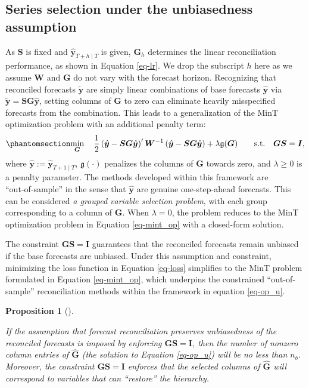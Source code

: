 \documentclass[
  11pt]{article}
\theoremstyle{plain}
\newtheorem{proposition}{Proposition}[section]
\theoremstyle{remark}
\begin{document}
\subsection{Series selection under the unbiasedness
assumption}\label{sec-constrained}

As \(\bm{S}\) is fixed and \(\hat{\bm{y}}_{T+h \mid T}\) is given,
\(\bm{G}_h\) determines the linear reconciliation performance, as shown
in Equation \eqref{eq-lr}. We drop the subscript \(h\) here as we assume
\(\bm{W}\) and \(\bm{G}\) do not vary with the forecast horizon.
Recognizing that reconciled forecasts \(\tilde{\bm{y}}\) are simply
linear combinations of base forecasts \(\hat{\bm{y}}\) via
\(\tilde{\bm{y}}=\bm{SG}\hat{\bm{y}}\), setting columns of \(\bm{G}\) to
zero can eliminate heavily misspecified forecasts from the combination.
This leads to a generalization of the MinT optimization problem with an
additional penalty term: \begin{equation}\phantomsection\label{eq-op_u}{
\min_{\bm{G}} \quad \frac{1}{2}\left(\hat{\bm{y}}-\bm{SG}\hat{\bm{y}}\right)^{\prime} \bm{W}^{-1}\left(\hat{\bm{y}}-\bm{SG}\hat{\bm{y}}\right)
+ \lambda\mathfrak{g}(\bm{G}) \qquad \text{s.t.} \quad \bm{G}\bm{S}=\bm{I},
}\end{equation} where \(\hat{\bm{y}}:=\hat{\bm{y}}_{T+1 \mid T}\),
\(\mathfrak{g}(\cdot)\) penalizes the columns of \(\bm{G}\) towards
zero, and \(\lambda \geq 0\) is a penalty parameter. The methods
developed within this framework are ``out‑of‑sample'' in the sense that
\(\hat{\bm{y}}\) are genuine one-step-ahead forecasts. This can be
considered \emph{a grouped variable selection problem}, with each group
corresponding to a column of \(\bm{G}\). When \(\lambda = 0\), the
problem reduces to the MinT optimization problem in Equation
\eqref{eq-mint_op} with a closed-form solution.

The constraint \(\bm{G}\bm{S}=\bm{I}\) guarantees that the reconciled
forecasts remain unbiased if the base forecasts are unbiased. Under this
assumption and constraint, minimizing the loss function in Equation
\eqref{eq-loss} simplifies to the MinT problem formulated in Equation
\eqref{eq-mint_op}, which underpins the constrained ``out-of-sample''
reconciliation methods within the framework in equation \eqref{eq-op_u}.

\begin{proposition}[]\protect\hypertarget{prp-1}{}\label{prp-1}

If the assumption that forecast reconciliation preserves unbiasedness of
the reconciled forecasts is imposed by enforcing \(\bm{GS}=\bm{I}\),
then the number of nonzero column entries of \(\hat{\bm{G}}\) (the
solution to Equation \eqref{eq-op_u}) will be no less than \(n_b\).
Moreover, the constraint \(\bm{GS}=\bm{I}\) enforces that the selected
columns of \(\hat{\bm{G}}\) will correspond to variables that can
``restore'' the hierarchy.

\end{proposition}
\end{document}
